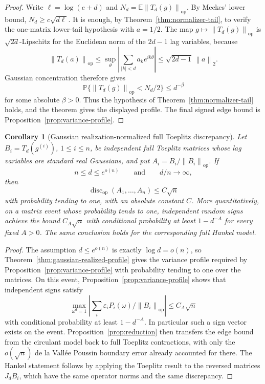 \documentclass[11pt]{amsart}
\numberwithin{equation}{section}
\newtheorem{corollary}[theorem]{Corollary}
\theoremstyle{definition}
\theoremstyle{remark}
\newcommand{\op}{\mathrm{op}}
\newcommand{\discop}{\operatorname{disc}_{\op}}
\newcommand{\Prob}{\mathbb P}
\newcommand{\Exp}{\mathbb E}
\newcommand{\norm}[1]{\left\lVert #1\right\rVert}
\newcommand{\abs}[1]{\left\lvert #1\right\rvert}
\newcommand{\eps}{\varepsilon}
\begin{document}
\begin{proof}
Write \(\ell=\log(e+d)\) and \(N_d=\Exp\norm{T_d(g)}_{\op}\).  By Meckes'
lower bound, \(N_d\ge c\sqrt{d\ell}\).  It is enough, by
Theorem~\ref{thm:normalizer-tail}, to verify the one-matrix lower-tail
hypothesis with \(a=1/2\).
The map \(g\mapsto \norm{T_d(g)}_{\op}\) is \(\sqrt{2d}\)-Lipschitz for the
Euclidean norm of the \(2d-1\) lag variables, because
\[
  \norm{T_d(a)}_{\op}
  \le \sup_{\theta}\abs{\sum_{\abs k<d}a_ke^{ik\theta}}
  \le \sqrt{2d-1}\,\norm{a}_2 .
\]
Gaussian concentration therefore gives
\[
  \Prob\{\norm{T_d(g)}_{\op}<N_d/2\}\le d^{-\beta}
\]
for some absolute \(\beta>0\).  Thus the hypothesis of
Theorem~\ref{thm:normalizer-tail} holds, and the theorem gives the displayed
profile.  The final signed edge bound is Proposition~\ref{prop:variance-profile}.
\end{proof}

\begin{corollary}[Gaussian realization-normalized full Toeplitz discrepancy]
\label{cor:gaussian-realized-discrepancy}
Let \(B_i=T_d(g^{(i)})\), \(1\le i\le n\), be independent full Toeplitz
matrices whose lag variables are standard real Gaussians, and put
\(A_i=B_i/\norm{B_i}_{\op}\).  If
\[
  n\le d\le e^{o(n)}
  \qquad\text{and}\qquad d/n\to\infty ,
\]
then
\[
  \discop(A_1,\ldots,A_n)\le C\sqrt n
\]
with probability tending to one, with an absolute constant \(C\).  More
quantitatively, on a matrix event whose probability tends to one, independent
random signs achieve the bound \(C_A\sqrt n\) with conditional probability at
least \(1-d^{-A}\) for every fixed \(A>0\).  The same conclusion holds for the
corresponding full Hankel model.
\end{corollary}

\begin{proof}
The assumption \(d\le e^{o(n)}\) is exactly \(\log d=o(n)\), so
Theorem~\ref{thm:gaussian-realized-profile} gives the variance profile
required by Proposition~\ref{prop:variance-profile} with probability tending to
one over the matrices.  On this event, Proposition~\ref{prop:variance-profile}
shows that independent signs satisfy
\[
  \max_{\omega^d=1}\abs{\sum_i\eps_i
  P_i(\omega)/\norm{B_i}_{\op}}\le C_A\sqrt n
\]
with conditional probability at least \(1-d^{-A}\).  In particular such a sign
vector exists on the event.  Proposition~\ref{prop:reduction} then transfers
the edge bound from the circulant model back to full Toeplitz contractions,
with only the \(o(\sqrt n)\) de la Vall\'ee Poussin boundary error already
accounted for there.  The Hankel statement follows by applying the Toeplitz
result to the reversed matrices \(J_dB_i\), which have the same operator norms
and the same discrepancy.
\end{proof}
\end{document}
